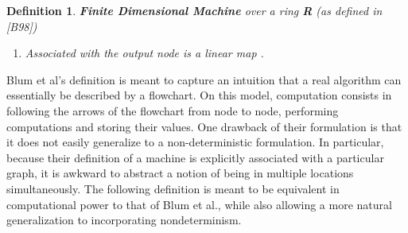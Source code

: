 \documentclass[twoside]{article}
\renewcommand{\cite}[1]{[#1]}
\newtheorem{definition}{Definition}[section]
\begin{document}
\begin{definition}{\textbf{Finite Dimensional Machine} over a ring
    \textbf{R} (as defined in \cite{B98})}
\begin{enumerate}
  \item Associated with the output node is a linear map
    .
    
  \end{enumerate}
\end{definition}

Blum et al's definition is meant to capture an intuition that a real
algorithm can essentially be described by a flowchart.  On this model,
computation consists in following the arrows of the flowchart from
node to node, performing computations and storing their values.  One
drawback of their formulation is that it does not easily generalize to
a non-deterministic formulation.  In particular, because their
definition of a machine is explicitly associated with a particular
graph, it is awkward to abstract a notion of being in multiple
locations simultaneously.  The following definition is meant to be
equivalent in computational power to that of Blum et al., while also
allowing a more natural generalization to incorporating
nondeterminism.
\end{document}
